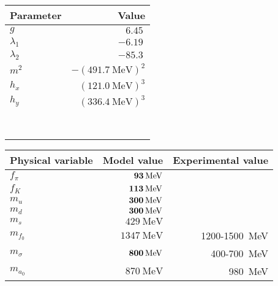 \begin{table}
\centering
\begin{tabular}{ l r }
	\toprule
	Parameter   & Value                                 \\
	\midrule
	$g$         & $\SI{6.45}{}$                         \\
	$\lambda_1$ & $-\SI{6.19}{}$                        \\
	$\lambda_2$ & $-\SI{85.3}{}$                        \\
	$m^2$       & $-(\SI{491.7}{\mega\electronvolt})^2$ \\
	$h_x$       & $(\SI{121.0}{\mega\electronvolt})^3$  \\
	$h_y$       & $(\SI{336.4}{\mega\electronvolt})^3$  \\
	\\
	\\
	\\
	\\
	\\
	\\
	\\
	\\
	\bottomrule
\end{tabular}
\hfill
\begin{tabular}{ l r r }
	\toprule
	Physical variable & Model value                             & Experimental value                      \\
	\midrule
	$f_\pi$           & $\textbf{\SI{93}{\mega\electronvolt}}$  & \TODO{?}                                         \\
	$f_K$             & $\textbf{\SI{113}{\mega\electronvolt}}$ & \TODO{?}                                         \\
	\midrule
	$m_u$             & $\textbf{\SI{300}{\mega\electronvolt}}$ & \TODO{?}                                         \\
	$m_d$             & $\textbf{\SI{300}{\mega\electronvolt}}$ & \TODO{?}                                         \\
	$m_s$             & $\SI{429}{\mega\electronvolt}$          & \TODO{?}                                         \\
	\midrule
	$m_{f_0}$         & $\SI{1347}{\mega\electronvolt}$         & \SI{1200}{}-\SI{1500}{\mega\electronvolt}        \\
	$m_\sigma$        & $\textbf{\SI{800}{\mega\electronvolt}}$ & \SI{400}{}-\SI{700}{\mega\electronvolt}          \\
	$m_{a_0}$         & $\SI{870}{\mega\electronvolt}$          & \SI{980}{\mega\electronvolt}                     \\

\end{tabular}
\end{table}
